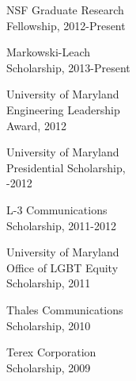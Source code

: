 \documentclass[12pt,letterpaper]{deedy-resume} %
\begin{document}
\begin{minipage}[t][6.8in]{0.33\textwidth}
\textbullet{} NSF Graduate Research\\ \quad Fellowship, 2012-Present\\
\vspace{0.1cm}

\textbullet{} Markowski-Leach\\ \quad Scholarship, 2013-Present\\
\vspace{0.1cm}

\textbullet{} University of Maryland\\ \quad Engineering Leadership\\ \quad Award, 2012\\
\vspace{0.1cm}

\textbullet{} University of Maryland\\ \quad Presidential Scholarship,\\ -2012\\
\vspace{0.1cm}

\textbullet{} L-3 Communications\\ \quad Scholarship, 2011-2012\\
\vspace{0.1cm}

\textbullet{} University of Maryland\\ \quad Office of LGBT Equity\\ \quad Scholarship, 2011\\
\vspace{0.1cm}

\textbullet{} Thales Communications\\ \quad Scholarship, 2010\\
\vspace{0.1cm}

\textbullet{} Terex Corporation\\ \quad Scholarship, 2009\\

\end{minipage}%
\hfill
%
%
\hspace{-3in}
\end{document}
